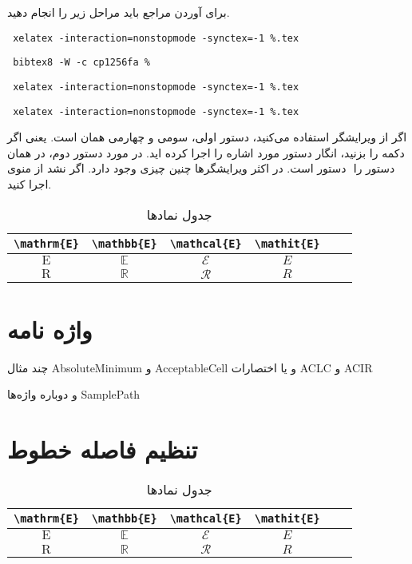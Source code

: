 \documentclass{report}
\begin{document}
برای آوردن مراجع باید مراحل زیر را انجام دهید.
\begin{itemize}
\begin{LTRitems}
\item
\verb+ xelatex -interaction=nonstopmode -synctex=-1 %.tex+
\item
\verb+ bibtex8 -W -c cp1256fa % +
\item
\verb+ xelatex -interaction=nonstopmode -synctex=-1 %.tex+
\item
\verb+ xelatex -interaction=nonstopmode -synctex=-1 %.tex+
\end{LTRitems}
\end{itemize}
اگر از ویرایشگر {} استفاده می‌کنید، دستور اولی، سومی و چهارمی همان {} است. یعنی اگر دکمه {} را بزنید، انگار دستور مورد اشاره را اجرا کرده اید. در مورد دستور دوم، در {} همان دستور {} است. در اکثر ویرایشگرها چنین چیزی وجود دارد.  اگر نشد از منوی ‎‎ دستور
را اجرا کنید. 

\begin{table}
\caption{جدول نمادها}
\label{table:asas}
\begin{tabular}{|c|c|c|c|c|c}\hline
\verb|\mathrm{E}| & \verb|\mathbb{E}|& \verb|\mathcal{E}|& \verb|\mathit{E}|\\\hline
$\mathrm{E}$ & $\mathbb{E}$ & $\mathcal{E}$ & $\mathit{E}$\\\hline
$\mathrm{R}$ & $\mathbb{R}$ & $\mathcal{R}$ & $\mathit{R}$\\\hline
\end{tabular}
\end{table}

\chapter{واژه نامه}
چند مثال 
\gls{AbsoluteMinimum} و \gls{AcceptableCell}
 و یا اختصارات
\gls{ACLC} و \gls{ACIR}

و دوباره واژه‌ها
\gls{SamplePath}

\chapter{تنظیم فاصله خطوط}
\ptext[1]
\begin{latin}
\lipsum[1]
\end{latin}
\ptext[2]
\begin{latin}
\lipsum[2]
\end{latin}
\begin{table}
\centering
\caption{جدول نمادها}
\label{table:asas2}
\begin{tabular}{|c|c|c|c|c|c}\hline
\verb|\mathrm{E}| & \verb|\mathbb{E}|& \verb|\mathcal{E}|& \verb|\mathit{E}|\\\hline
$\mathrm{E}$ & $\mathbb{E}$ & $\mathcal{E}$ & $\mathit{E}$\\\hline
$\mathrm{R}$ & $\mathbb{R}$ & $\mathcal{R}$ & $\mathit{R}$\\\hline
\end{tabular}
\end{table}
\end{document}
